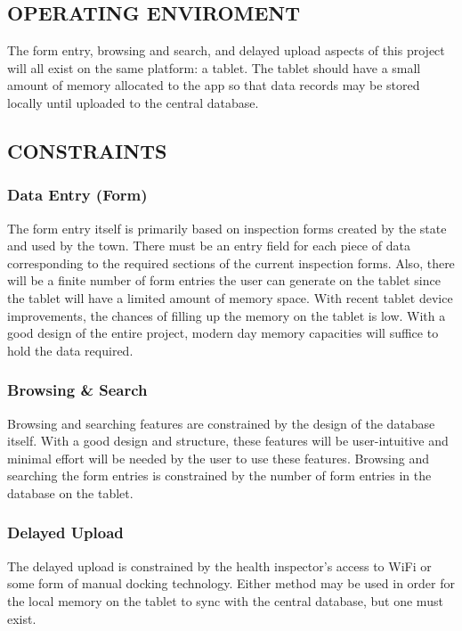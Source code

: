 \documentclass[twoside,letterpaper]{article}
\begin{document}
\subsection[OPERATING ENVIRONMENT]{\rmfamily\bfseries\color{black}
OPERATING ENVIROMENT}
{\rmfamily\color{black}
The form entry, browsing and search, and delayed upload aspects of this project will all exist on the same platform: a tablet. The tablet should have a small amount of memory allocated to the app so that data records may be stored locally until uploaded to the central database.}



\subsection[CONSTRAINTS]{\rmfamily\bfseries\color{black}
CONSTRAINTS}
\subsubsection{Data Entry (Form)}
{\color{black}
The form entry itself is primarily based on inspection forms created by the state and used by the town. There must be an entry field for each piece of data corresponding to the required sections of the current inspection forms. Also, there will be a finite number of form entries the user can generate on the tablet since the tablet will have a limited amount of memory space. With recent tablet device improvements, the chances of filling up the memory on the tablet is low. With a good design of the entire project, modern day memory capacities will suffice to hold the data required.}

\subsubsection{Browsing \& Search}
{\color{black}
Browsing and searching features are constrained by the design of the database itself. With a good design and structure, these features will be user-intuitive and minimal effort will be needed by the user to use these features. Browsing and searching the form entries is constrained by the number of form entries in the database on the tablet.}

\subsubsection{Delayed Upload}
{\color{black}
The delayed upload is constrained by the health inspector's access to WiFi or some form of manual docking technology. Either method may be used in order for the local memory on the tablet to sync with the central database, but one must exist.}
\end{document}

